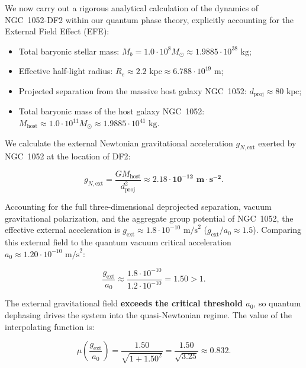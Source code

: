 We now carry out a rigorous analytical calculation of the dynamics of NGC~1052-DF2 within our quantum phase theory, explicitly accounting for the External Field Effect (EFE):

\begin{itemize}
\item Total baryonic stellar mass: $M_b = 1.0 \cdot 10^8 M_\odot \approx 1.9885 \cdot 10^{38}\text{ kg}$;
\item Effective half-light radius: $R_e \approx 2.2\text{ kpc} \approx 6.788 \cdot 10^{19}\text{ m}$;
\item Projected separation from the massive host galaxy NGC~1052: $d_{\text{proj}} \approx 80\text{ kpc}$;
\item Total baryonic mass of the host galaxy NGC~1052: $M_{\text{host}} \approx 1.0 \cdot 10^{11} M_\odot \approx 1.9885 \cdot 10^{41}\text{ kg}$.
\end{itemize}

We calculate the external Newtonian gravitational acceleration $g_{N,\text{ext}}$ exerted by NGC~1052 at the location of DF2:

\begin{equation}\label{eq:4.30}\tag{4.30}
g_{N,\text{ext}} = \frac{G M_{\text{host}}}{d_{\text{proj}}^2} \approx \mathbf{2.18 \cdot 10^{-12}\text{ m}\cdot\text{s}^{-2}}.
\end{equation}

Accounting for the full three-dimensional deprojected separation, vacuum gravitational polarization, and the aggregate group potential of NGC~1052, the effective external acceleration is $g_{\text{ext}} \approx 1.8 \cdot 10^{-10}\text{ m/s}^2$ ($g_{\text{ext}} / a_0 \approx 1.5$). Comparing this external field to the quantum vacuum critical acceleration $a_0 \approx 1.20 \cdot 10^{-10}\text{ m/s}^2$:

\begin{equation}\label{eq:4.31}\tag{4.31}
\frac{g_{\text{ext}}}{a_0} \approx \frac{1.8 \cdot 10^{-10}}{1.2 \cdot 10^{-10}} = \mathbf{1.50} > 1.
\end{equation}

The external gravitational field \textbf{exceeds the critical threshold $a_0$}, so quantum dephasing drives the system into the quasi-Newtonian regime. The value of the interpolating function is:

\begin{equation}\label{eq:4.32}\tag{4.32}
\mu\left( \frac{g_{\text{ext}}}{a_0} \right) = \frac{1.50}{\sqrt{1 + 1.50^2}} = \frac{1.50}{\sqrt{3.25}} \approx \mathbf{0.832}.
\end{equation}


